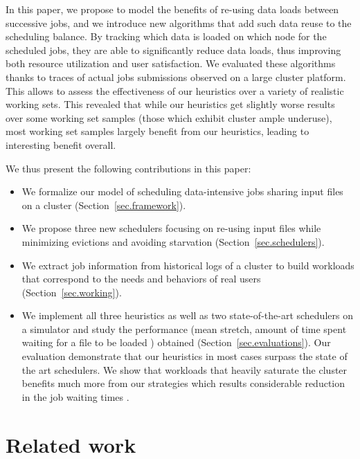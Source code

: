 \documentclass[sigconf,review,anonymous]{acmart}
\newcommand{\rev}[1]{{\color{blue}{#1}}}
\begin{document}
In this paper, we propose to model the benefits of re-using data loads
between successive jobs, and we introduce new algorithms that add such
data reuse to the scheduling balance. By tracking which data is loaded
on which node for the scheduled jobs, they are able to significantly
reduce data loads, thus improving both resource utilization and user
satisfaction. We evaluated these algorithms thanks to traces of actual
jobs submissions observed on a large cluster platform. This allows to
assess the effectiveness of our heuristics over a variety of realistic
working sets. This revealed that while our heuristics get slightly worse
results over some working set samples (those which exhibit cluster ample
underuse), most working set samples largely benefit from our heuristics,
leading to interesting benefit overall.

We thus present the following contributions in this paper:
\begin{itemize}
	\item We formalize our model of scheduling data-intensive jobs sharing input files on a cluster (Section~\ref{sec.framework}).
	\item We propose three new schedulers focusing on re-using input files while minimizing evictions and avoiding starvation (Section~\ref{sec.schedulers}).
	\item We extract job information from historical logs of a cluster to build workloads that correspond to the needs and behaviors of real users (Section~\ref{sec.working}).
	\item We implement all three heuristics as well as two state-of-the-art schedulers on a simulator and study the performance (mean stretch, amount of time spent waiting for a file to be loaded \rev{and number of core hours}) obtained \rev{after scheduling almost 2 millions jobs} (Section~\ref{sec.evaluations}).
	Our evaluation demonstrate that our heuristics in most cases surpass the state of the art schedulers.
	We show that workloads that heavily saturate the cluster
    benefits much more from our strategies which results
    considerable reduction in the job waiting times \rev{as well as the total core hours}.
\end{itemize}

\section{Related work}\label{sec.related_work}
\end{document}
